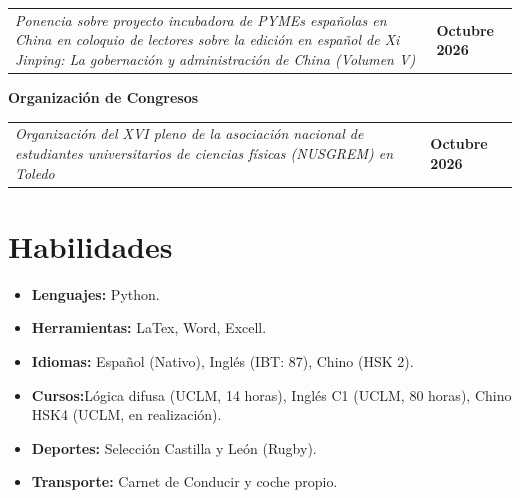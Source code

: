 \documentclass[11pt,a4paper]{article}
\begin{document}
\noindent
\begin{tabularx}{\textwidth}{@{}X >{\raggedleft\arraybackslash\bfseries}p{2.8cm}@{}}
\textit{Ponencia sobre proyecto incubadora de PYMEs españolas en China en coloquio de lectores sobre la edición en español de Xi Jinping: La gobernación y administración de China (Volumen V)} & Octubre 2026\\[2pt]

\end{tabularx}
\noindent\textbf{Organización de Congresos}\par\smallskip

\noindent
\begin{tabularx}{\textwidth}{@{}X >{\raggedleft\arraybackslash\bfseries}p{2.8cm}@{}}
\textit{Organización del XVI pleno de la asociación nacional de estudiantes universitarios de ciencias físicas (NUSGREM) en Toledo} & Octubre 2026\\[2pt]
\end{tabularx}
\section*{Habilidades}
\begin{itemize}[leftmargin=*,nosep]
    \item \textbf{Lenguajes:} Python.
    \item \textbf{Herramientas:} LaTex, Word, Excell.
    \item \textbf{Idiomas:} Español (Nativo), Inglés (IBT: 87), Chino (HSK 2).
    \item \textbf{Cursos:}Lógica difusa (UCLM, 14 horas), Inglés C1 (UCLM, 80 horas), Chino HSK4 (UCLM, en realización).
    \item \textbf{Deportes:} Selección Castilla y León (Rugby).
    \item \textbf{Transporte:} Carnet de Conducir y coche propio.
\end{itemize}
\end{document}
